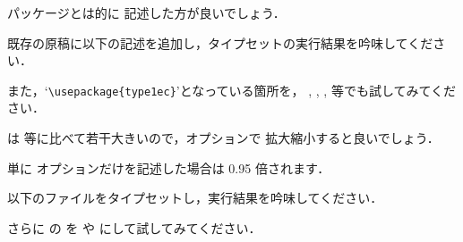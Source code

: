 \begin{InTeX}
\usepackage[T1]{fontenc}
\usepackage{textcomp}
\usepackage{type1ec}
\end{InTeX}

パッケージとは的に
記述した方が良いでしょう．

\begin{Exe}
既存の原稿に以下の記述を追加し，タイプセットの実行結果を吟味してください．

\begin{InTeX}
\usepackage{textcomp}
\usepackage{type1ec}
\end{InTeX}

また，`\verb|\usepackage{type1ec}|'となっている箇所を，
, , , 
等でも試してみてください．
\end{Exe}


は  等に比べて若干大きいので，オプションで
拡大縮小すると良いでしょう．

\begin{InTeX}
\usepackage[scaled=.92]{helvet}
\end{InTeX}

単に  オプションだけを記述した場合は 0.95 倍されます．

\begin{InTeX}
\usepackage[scaled]{helvet} %
\end{InTeX}


\begin{Exe}
以下のファイルをタイプセットし，実行結果を吟味してください．


さらに  の  を  や 
にして試してみてください．
\end{Exe}

